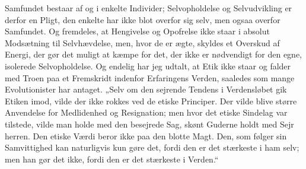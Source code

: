 \documentclass[12pt,a4paper,openany]{book}
\newcommand{\opage}[1]{\marginnote{\footnotesize\textit{[#1]}}}
\begin{document}
Samfundet bestaar af og i enkelte Individer; Selvopholdelse og Selvudvikling
er derfor en Pligt, den enkelte har ikke blot overfor sig
selv, men ogsaa overfor Samfundet. Og fremdeles, at Hengivelse og
Opofrelse ikke staar i absolut Modsætning til Selvhævdelse, men,
hvor de er ægte, skyldes et Overskud af Energi, der gør det muligt
at kæmpe for det, der ikke er nødvendigt for den egne, isolerede
Selvopholdelse. Og endelig har jeg udtalt, at Etik ikke staar og falder
med Troen paa et Fremskridt indenfor Erfaringens Verden, saaledes
som mange Evolutionister har antaget. „Selv om den sejrende
Tendens i Verdensløbet gik Etiken imod, vilde der ikke rokkes ved
de etiske Principer. Der vilde blive større Anvendelse for Medlidenhed
og Resignation; men hvor det etiske Sindelag var tilstede, vilde
man holde med den besejrede Sag, skønt Guderne holdt med Sejr%
\opage{76}herren. Den etiske Værdi beror ikke paa den blotte Magt. Den, som
følger sin Samvittighed kan naturligvis kun gøre det, fordi den er det
stærkeste i ham selv; men han gør det ikke, fordi den er det stærkeste
i Verden.“
\end{document}
